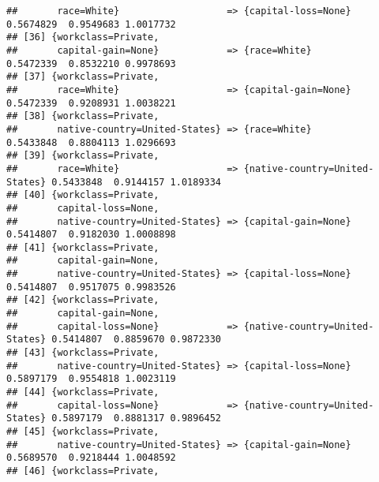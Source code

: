 \documentclass[]{article}
\begin{document}
\begin{verbatim}
##       race=White}                   => {capital-loss=None}            0.5674829  0.9549683 1.0017732
## [36] {workclass=Private,                                                                            
##       capital-gain=None}            => {race=White}                   0.5472339  0.8532210 0.9978693
## [37] {workclass=Private,                                                                            
##       race=White}                   => {capital-gain=None}            0.5472339  0.9208931 1.0038221
## [38] {workclass=Private,                                                                            
##       native-country=United-States} => {race=White}                   0.5433848  0.8804113 1.0296693
## [39] {workclass=Private,                                                                            
##       race=White}                   => {native-country=United-States} 0.5433848  0.9144157 1.0189334
## [40] {workclass=Private,                                                                            
##       capital-loss=None,                                                                            
##       native-country=United-States} => {capital-gain=None}            0.5414807  0.9182030 1.0008898
## [41] {workclass=Private,                                                                            
##       capital-gain=None,                                                                            
##       native-country=United-States} => {capital-loss=None}            0.5414807  0.9517075 0.9983526
## [42] {workclass=Private,                                                                            
##       capital-gain=None,                                                                            
##       capital-loss=None}            => {native-country=United-States} 0.5414807  0.8859670 0.9872330
## [43] {workclass=Private,                                                                            
##       native-country=United-States} => {capital-loss=None}            0.5897179  0.9554818 1.0023119
## [44] {workclass=Private,                                                                            
##       capital-loss=None}            => {native-country=United-States} 0.5897179  0.8881317 0.9896452
## [45] {workclass=Private,                                                                            
##       native-country=United-States} => {capital-gain=None}            0.5689570  0.9218444 1.0048592
## [46] {workclass=Private,                                                                            

\end{verbatim}
\end{document}
